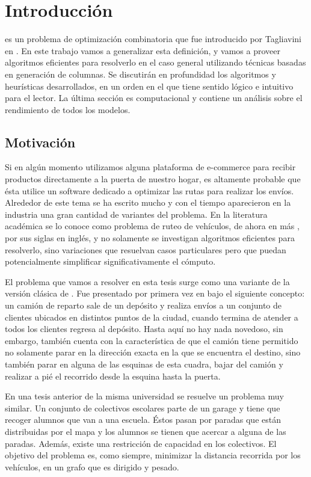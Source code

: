 \chapter{Introducción}

 es un problema de optimización combinatoria que fue introducido por Tagliavini en \cite{tagliavini}. En este trabajo vamos a generalizar esta definición, y vamos a proveer algoritmos eficientes para resolverlo en el caso general utilizando técnicas basadas en generación de columnas. Se discutirán en profundidad los algoritmos y heurísticas desarrollados, en un orden en el que tiene sentido lógico e intuitivo para el lector. La última sección es computacional y contiene un análisis sobre el rendimiento de todos los modelos. 


\section{Motivación}

Si en algún momento utilizamos alguna plataforma de e-commerce para recibir productos directamente a la puerta de nuestro hogar, es altamente probable que ésta utilice un software dedicado a optimizar las rutas para realizar los envíos. Alrededor de este tema se ha escrito mucho y con el tiempo aparecieron en la industria una gran cantidad de variantes del problema. En la literatura académica se lo conoce como problema de ruteo de vehículos, de ahora en más , por sus siglas en inglés, y no solamente se investigan algoritmos eficientes para resolverlo, sino variaciones que resuelvan casos particulares pero que puedan potencialmente simplificar significativamente el cómputo. 

El problema que vamos a resolver en esta tesis surge como una variante de la versión clásica de . Fue presentado por primera vez en \cite{tagliavini} bajo el siguiente concepto: un camión de reparto sale de un depósito y realiza envíos a un conjunto de clientes ubicados en distintos puntos de la ciudad, cuando termina de atender a todos los clientes regresa al depósito. Hasta aquí no hay nada novedoso, sin embargo, también cuenta con la característica de que el camión tiene permitido no solamente parar en la dirección exacta en la que se encuentra el destino, sino también parar en alguna de las esquinas de esta cuadra, bajar del camión y realizar a pié el recorrido desde la esquina hasta la puerta.

En una tesis anterior de la misma universidad \cite{mongi-badia} se resuelve un problema muy similar. Un conjunto de colectivos escolares parte de un garage y tiene que recoger alumnos que van a una escuela. Éstos pasan por paradas que están distribuidas por el mapa y los alumnos se tienen que acercar a alguna de las paradas. Además, existe una restricción de capacidad en los colectivos. El objetivo del problema es, como siempre, minimizar la distancia recorrida por los vehículos, en un grafo que es dirigido y pesado.

